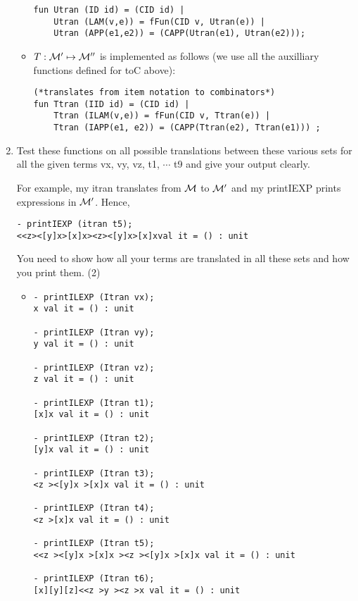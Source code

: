 \documentclass[11pt]{article}
\newcommand \cM {\cal M}
\begin{document}
\begin{enumerate}
\begin{itemize}
\begin{verbatim}
fun Utran (ID id) = (CID id) |
    Utran (LAM(v,e)) = fFun(CID v, Utran(e)) |
    Utran (APP(e1,e2)) = (CAPP(Utran(e1), Utran(e2)));
	      	      \end{verbatim}
	      	\item
	      	      $T:{\cal M}'\mapsto {\cal M}''$ is implemented as follows (we use all the auxilliary functions defined for toC above):
	      	      \begin{verbatim}
(*translates from item notation to combinators*)
fun Ttran (IID id) = (CID id) |
    Ttran (ILAM(v,e)) = fFun(CID v, Ttran(e)) |
    Ttran (IAPP(e1, e2)) = (CAPP(Ttran(e2), Ttran(e1))) ;
	      	      \end{verbatim}
	      \end{itemize}
	      \color{black}
	\item
	      Test these functions on all possible translations between these various sets for all the given terms vx, vy, vz, t1, $\cdots$ t9 and give your output clearly.
	      
	      For example, my itran translates from $\cM$ to $\cM'$ and my printIEXP prints expressions in $\cM'$.  Hence,  
	      \begin{verbatim}
- printIEXP (itran t5);
<<z><[y]x>[x]x><z><[y]x>[x]xval it = () : unit
	      \end{verbatim}
	      You need to show how all your terms are translated in all these sets and how you print them.
	      \hfill{(2)} %
	      
	      \color{red}
	      \begin{itemize}
	      	\item
	      	      \begin{verbatim}
- printILEXP (Itran vx);
x val it = () : unit

- printILEXP (Itran vy);
y val it = () : unit

- printILEXP (Itran vz);
z val it = () : unit

- printILEXP (Itran t1);
[x]x val it = () : unit

- printILEXP (Itran t2);
[y]x val it = () : unit

- printILEXP (Itran t3);
<z ><[y]x >[x]x val it = () : unit

- printILEXP (Itran t4);
<z >[x]x val it = () : unit

- printILEXP (Itran t5);
<<z ><[y]x >[x]x ><z ><[y]x >[x]x val it = () : unit

- printILEXP (Itran t6);
[x][y][z]<<z >y ><z >x val it = () : unit


\end{verbatim}
\end{itemize}
\end{enumerate}
\end{document}
